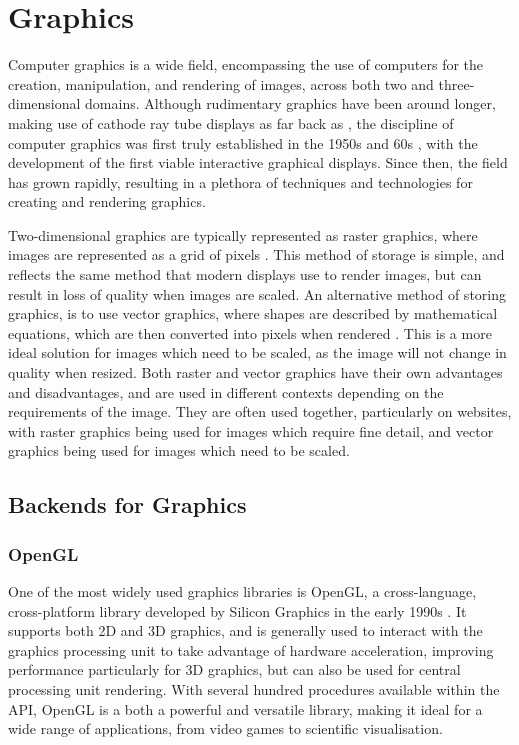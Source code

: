 \documentclass[../main.tex]{subfiles}
\begin{document}
    \section{Graphics}
        Computer graphics is a wide field, encompassing the use of computers for the
            creation, manipulation, and rendering of images, across both two and
            three-dimensional domains.
        Although rudimentary graphics have been around longer, making use of cathode
            ray tube displays as far back as \citet{crtBraun}, the discipline of computer
            graphics was first truly established in the 1950s and 60s \citep{graphics},
            with the development of the first viable interactive graphical displays.
        Since then, the field has grown rapidly, resulting in a plethora of techniques
            and technologies for creating and rendering graphics.

        Two-dimensional graphics are typically represented as raster graphics, where
            images are represented as a grid of pixels \citep{rasterGraphics}.
        This method of storage is simple, and reflects the same method that modern
            displays use to render images, but can result in loss of quality when images
            are scaled.
        An alternative method of storing graphics, is to use vector graphics, where
            shapes are described by mathematical equations, which are then converted into
            pixels when rendered \citep{vectorGraphics}.
        This is a more ideal solution for images which need to be scaled, as the image
            will not change in quality when resized.
        Both raster and vector graphics have their own advantages and disadvantages,
            and are used in different contexts depending on the requirements of the image.
        They are often used together, particularly on websites, with raster graphics
            being used for images which require fine detail, and vector graphics being used
            for images which need to be scaled.

        \subsection{Backends for Graphics}
            \subsubsection{OpenGL}
                One of the most widely used graphics libraries is OpenGL, a cross-language,
                    cross-platform library developed by Silicon Graphics in the early 1990s
                    \citep{openGL}.
                It supports both 2D and 3D graphics, and is generally used to interact with the
                    graphics processing unit to take advantage of hardware acceleration, improving
                    performance particularly for 3D graphics, but can also be used for central
                    processing unit rendering.
                With several hundred procedures available within the API, OpenGL is a both a
                    powerful and versatile library, making it ideal for a wide range of
                    applications, from video games to scientific visualisation.
\end{document}
